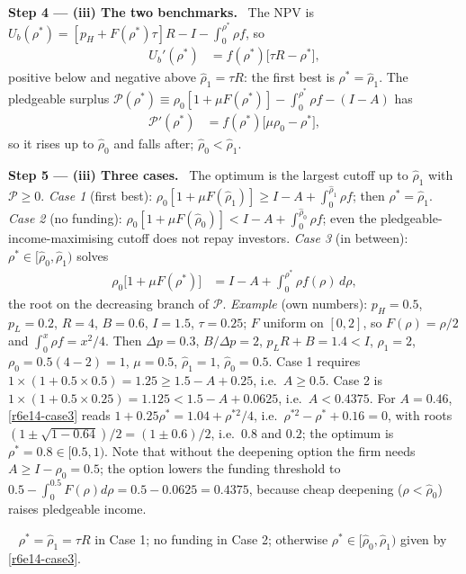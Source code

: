\documentclass[11pt,a4paper]{article}
\newcommand{\step}[2]{\par\medskip\noindent\textbf{Step #1 --- #2.}~}
\newcommand{\answer}[1]{\par\smallskip\noindent\fbox{\textbf{Answer #1.}}~}
\begin{document}
\step{4}{(iii) The two benchmarks} The NPV is $U_b(\rho^*)=[p_H+F(\rho^*)\tau]R-I-\int_0^{\rho^*}\rho f$, so
\begin{align}
  U_b'(\rho^*) &= f(\rho^*)\big[\tau R-\rho^*\big], \label{r6e14-dU}
\end{align}
positive below and negative above $\hat\rho_1=\tau R$: the first best is $\rho^*=\hat\rho_1$. The pledgeable surplus $\mathcal P(\rho^*)\equiv\rho_0[1+\mu F(\rho^*)]-\int_0^{\rho^*}\rho f-(I-A)$ has
\begin{align}
  \mathcal P'(\rho^*) &= f(\rho^*)\big[\mu\rho_0-\rho^*\big], \label{r6e14-dP}
\end{align}
so it rises up to $\hat\rho_0$ and falls after; $\hat\rho_0<\hat\rho_1$.

\step{5}{(iii) Three cases} The optimum is the largest cutoff up to $\hat\rho_1$ with $\mathcal P\ge0$.
\emph{Case 1} (first best): $\rho_0[1+\mu F(\hat\rho_1)]\ge I-A+\int_0^{\hat\rho_1}\rho f$; then $\rho^*=\hat\rho_1$.
\emph{Case 2} (no funding): $\rho_0[1+\mu F(\hat\rho_0)]<I-A+\int_0^{\hat\rho_0}\rho f$; even the pledgeable-income-maximising cutoff does not repay investors.
\emph{Case 3} (in between): $\rho^*\in[\hat\rho_0,\hat\rho_1)$ solves
\begin{align}
  \rho_0\big[1+\mu F(\rho^*)\big] &= I-A+\int_0^{\rho^*}\rho f(\rho)\,d\rho, \label{r6e14-case3}
\end{align}
the root on the decreasing branch of $\mathcal P$.
\emph{Example} (own numbers): $p_H=0.5$, $p_L=0.2$, $R=4$, $B=0.6$, $I=1.5$, $\tau=0.25$; $F$ uniform on $[0,2]$, so $F(\rho)=\rho/2$ and $\int_0^x\rho f=x^2/4$. Then $\Delta p=0.3$, $B/\Delta p=2$, $p_LR+B=1.4<I$, $\rho_1=2$, $\rho_0=0.5(4-2)=1$, $\mu=0.5$, $\hat\rho_1=1$, $\hat\rho_0=0.5$. Case 1 requires $1\times(1+0.5\times0.5)=1.25\ge1.5-A+0.25$, i.e.\ $A\ge0.5$. Case 2 is $1\times(1+0.5\times0.25)=1.125<1.5-A+0.0625$, i.e.\ $A<0.4375$. For $A=0.46$, \eqref{r6e14-case3} reads $1+0.25\rho^*=1.04+\rho^{*2}/4$, i.e.\ $\rho^{*2}-\rho^*+0.16=0$, with roots $(1\pm\sqrt{1-0.64})/2=(1\pm0.6)/2$, i.e.\ $0.8$ and $0.2$; the optimum is $\rho^*=0.8\in[0.5,1)$. Note that without the deepening option the firm needs $A\ge I-\rho_0=0.5$; the option lowers the funding threshold to $0.5-\int_0^{0.5}F(\rho)d\rho=0.5-0.0625=0.4375$, because cheap deepening ($\rho<\hat\rho_0$) raises pledgeable income.
\answer{(iii)} $\rho^*=\hat\rho_1=\tau R$ in Case 1; no funding in Case 2; otherwise $\rho^*\in[\hat\rho_0,\hat\rho_1)$ given by \eqref{r6e14-case3}.
\end{document}
